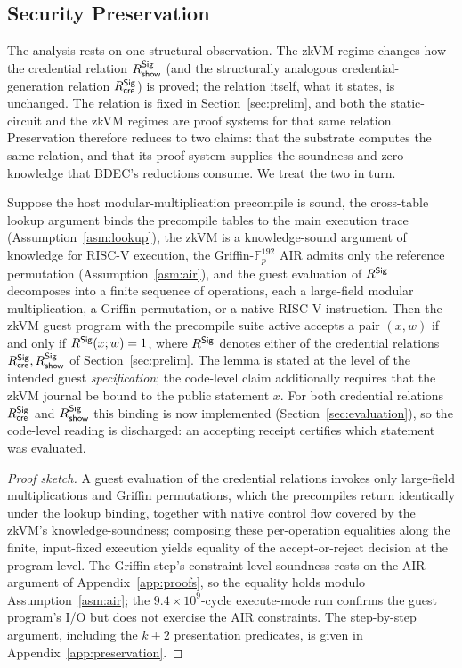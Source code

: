 \subsection{Security Preservation}\label{ssec:preservation}
The analysis rests on one structural observation. The zkVM regime changes how the credential relation $R_{\mathsf{show}}^{\mathsf{Sig}}$ (and the structurally analogous credential-generation relation $R_{\mathsf{cre}}^{\mathsf{Sig}}$) is proved; the relation itself, what it states, is unchanged. The relation is fixed in Section~\ref{sec:prelim}, and both the static-circuit and the zkVM regimes are proof systems for that same relation. Preservation therefore reduces to two claims: that the substrate computes the same relation, and that its proof system supplies the soundness and zero-knowledge that BDEC's reductions consume. We treat the two in turn.

\begin{lemma}\label{lem:relation-preserve}
    Suppose the host modular-multiplication precompile is sound, the cross-table lookup argument binds the precompile tables to the main execution trace (Assumption~\ref{asm:lookup}), the zkVM is a knowledge-sound argument of knowledge for RISC-V execution, the Griffin-$\mathbb{F}_p^{192}$ AIR admits only the reference permutation (Assumption~\ref{asm:air}), and the guest evaluation of $R^{\mathsf{Sig}}$ decomposes into a finite sequence of operations, each a large-field modular multiplication, a Griffin permutation, or a native RISC-V instruction. Then the zkVM guest program with the precompile suite active accepts a pair $(x,w)$ if and only if $R^{\mathsf{Sig}}(x;w)=1$, where $R^{\mathsf{Sig}}$ denotes either of the credential relations $R^{\mathsf{Sig}}_{\mathsf{cre}},R^{\mathsf{Sig}}_{\mathsf{show}}$ of Section~\ref{sec:prelim}. The lemma is stated at the level of the intended guest \emph{specification}; the code-level claim additionally requires that the zkVM journal be bound to the public statement $x$. For both credential relations $R^{\mathsf{Sig}}_{\mathsf{cre}}$ and $R^{\mathsf{Sig}}_{\mathsf{show}}$ this binding is now implemented (Section~\ref{sec:evaluation}), so the code-level reading is discharged: an accepting receipt certifies which statement was evaluated.
\end{lemma}

\begin{proof}[Proof sketch]
    A guest evaluation of the credential relations invokes only large-field multiplications and Griffin permutations, which the precompiles return identically under the lookup binding, together with native control flow covered by the zkVM's knowledge-soundness; composing these per-operation equalities along the finite, input-fixed execution yields equality of the accept-or-reject decision at the program level. The Griffin step's constraint-level soundness rests on the AIR argument of Appendix~\ref{app:proofs}, so the equality holds modulo Assumption~\ref{asm:air}; the $9.4\times10^{9}$-cycle execute-mode run confirms the guest program's I/O but does not exercise the AIR constraints. The step-by-step argument, including the $k+2$ presentation predicates, is given in Appendix~\ref{app:preservation}.
\end{proof}

